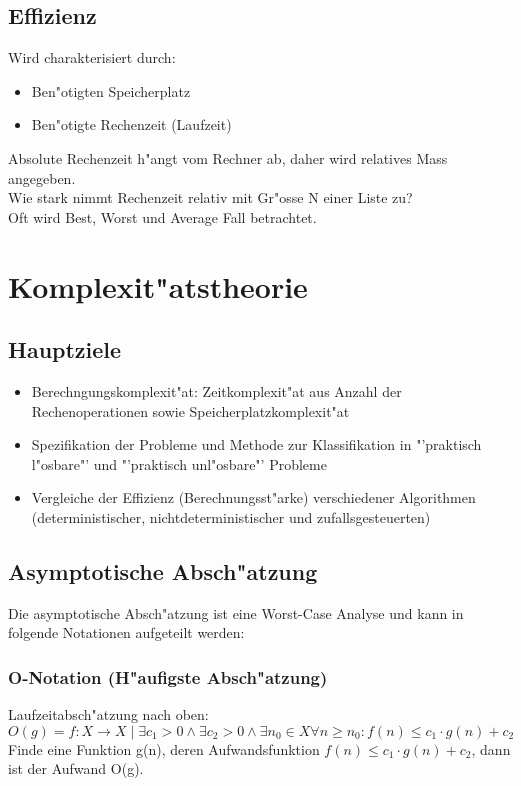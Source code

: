 \subsection{Effizienz}
Wird charakterisiert durch: 
\begin{itemize}
\item Ben"otigten Speicherplatz
\item Ben"otigte Rechenzeit (Laufzeit)
\end{itemize}
Absolute Rechenzeit h"angt vom Rechner ab, daher wird relatives Mass angegeben. \\
Wie stark nimmt Rechenzeit relativ mit Gr"osse N einer Liste zu? \\
Oft wird Best, Worst und Average Fall betrachtet.



\section{Komplexit"atstheorie}
\subsection{Hauptziele}
\begin{itemize}
\item Berechngungskomplexit"at: Zeitkomplexit"at aus Anzahl der Rechenoperationen sowie Speicherplatzkomplexit"at
\item Spezifikation der Probleme und Methode zur Klassifikation in "'praktisch l"osbare"' und "'praktisch unl"osbare"' Probleme
\item Vergleiche der Effizienz (Berechnungsst"arke) verschiedener Algorithmen (deterministischer, nichtdeterministischer und zufallsgesteuerten)
\end{itemize}
\subsection{Asymptotische Absch"atzung}
Die asymptotische Absch"atzung ist eine Worst-Case Analyse und kann in folgende Notationen aufgeteilt werden:

\subsubsection{O-Notation (H"aufigste Absch"atzung)}
Laufzeitabsch"atzung nach oben:
\begin{equation}
O(g) = {f: X \rightarrow X \mid \exists c_1>0 \wedge \exists c_2>0 \wedge \exists n_0 \in X  \forall n \geq n_0 : f(n) \leq c_1\cdot g(n) + c_2}
\end{equation}
Finde eine Funktion g(n), deren Aufwandsfunktion $f(n) \leq c_1 \cdot g(n) + c_2$, dann ist der Aufwand O(g).

